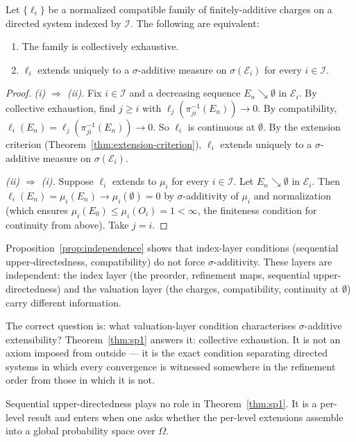 \begin{theorem}
\label{thm:sp1}
Let $\{\ell_i\}$ be a normalized compatible family of finitely-additive charges on
a directed system indexed by $\mathcal{I}$.  The following are equivalent:
\begin{enumerate}[label=(\roman*)]
  \item The family is collectively exhaustive.
  \item $\ell_i$ extends uniquely to a $\sigma$-additive measure on $\sigma(\mathcal{E}_i)$
        for every $i \in \mathcal{I}$.
\end{enumerate}
\end{theorem}

\begin{proof}
\emph{(i) $\Rightarrow$ (ii).}  Fix $i \in \mathcal{I}$ and a decreasing sequence $E_n \searrow
\emptyset$ in $\mathcal{E}_i$.  By collective exhaustion, find $j \geq i$ with
$\ell_j(\pi_{ji}^{-1}(E_n)) \to 0$.  By compatibility, $\ell_i(E_n) =
\ell_j(\pi_{ji}^{-1}(E_n)) \to 0$.  So $\ell_i$ is continuous at $\emptyset$.  By the
extension criterion (Theorem~\ref{thm:extension-criterion}), $\ell_i$ extends uniquely
to a $\sigma$-additive measure on $\sigma(\mathcal{E}_i)$.

\emph{(ii) $\Rightarrow$ (i).}  Suppose $\ell_i$ extends to $\mu_i$ for every $i \in \mathcal{I}$.
Let $E_n \searrow \emptyset$ in $\mathcal{E}_i$.  Then $\ell_i(E_n) = \mu_i(E_n) \to
\mu_i(\emptyset) = 0$ by $\sigma$-additivity of $\mu_i$ and normalization (which ensures
$\mu_i(E_0) \leq \mu_i(O_i) = 1 < \infty$, the finiteness condition for continuity from
above).  Take $j = i$.
\end{proof}

\begin{remark}[Dissolution]
\label{rem:dissolution}
Proposition~\ref{prop:independence} shows that index-layer conditions (sequential
upper-directedness, compatibility) do not force $\sigma$-additivity.  These layers are
independent: the index layer (the preorder, refinement maps, sequential upper-directedness)
and the valuation layer (the charges, compatibility, continuity at $\emptyset$) carry
different information.

The correct question is: what valuation-layer condition characterises $\sigma$-additive
extensibility?  Theorem~\ref{thm:sp1} answers it: collective exhaustion.  It is not an
axiom imposed from outside --- it is the exact condition separating directed systems
in which every convergence is witnessed somewhere in the refinement order from those
in which it is not.

Sequential upper-directedness plays no role in Theorem~\ref{thm:sp1}. It is a per-level
result and enters when one asks whether the per-level
extensions assemble into a global probability space over $\Omega$.

\end{remark}

